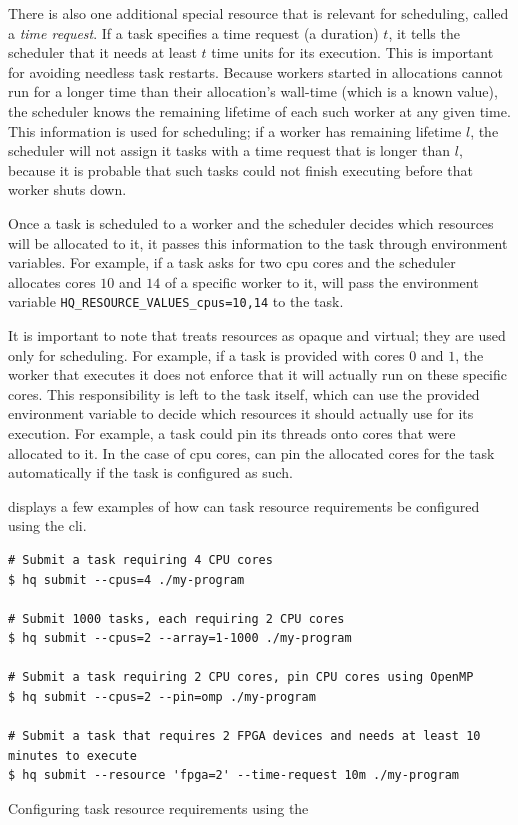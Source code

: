 There is also one additional special resource that is relevant for scheduling, called a
\emph{time request}. If a task specifies a time request (a duration) $t$, it
tells the scheduler that it needs at least $t$ time units for its execution.
This is important for avoiding needless task restarts. Because workers started in allocations
cannot run for a longer time than their allocation's wall-time (which is a known value), the
scheduler knows the remaining lifetime of each such worker at any given time. This information is
used for scheduling; if a worker has remaining lifetime $l$, the scheduler will
not assign it tasks with a time request that is longer than $l$, because it is
probable that such tasks could not finish executing before that worker shuts down.

Once a task is scheduled to a worker and the scheduler decides which resources will be allocated to
it, it passes this information to the task through environment variables. For example, if a task
asks for two \gls{cpu} cores and the scheduler allocates cores $10$
and $14$ of a specific worker to it, \hq{} will pass the
environment variable \texttt{HQ\_RESOURCE\_VALUES\_cpus=10,14} to the task.

It is important to note that \hyperqueue{} treats resources as opaque and virtual; they
are used only for scheduling. For example, if a task is provided with cores $0$
and $1$, the worker that executes it does not enforce that it will actually run
on these specific cores. This responsibility is left to the task itself, which can use the provided
environment variable to decide which resources it should actually use for its execution. For
example, a task could pin its threads onto cores that were allocated to it. In the case of
\gls{cpu} cores, \hq{} can pin the allocated cores for the task
automatically if the task is configured as such.

 displays a few examples of how can task resource requirements be
configured using the \gls{cli}.

\begin{listing}[h]
	\begin{verbatim}
# Submit a task requiring 4 CPU cores
$ hq submit --cpus=4 ./my-program

# Submit 1000 tasks, each requiring 2 CPU cores
$ hq submit --cpus=2 --array=1-1000 ./my-program

# Submit a task requiring 2 CPU cores, pin CPU cores using OpenMP
$ hq submit --cpus=2 --pin=omp ./my-program

# Submit a task that requires 2 FPGA devices and needs at least 10 minutes to execute
$ hq submit --resource 'fpga=2' --time-request 10m ./my-program
	\end{verbatim}
	\caption{Configuring task resource requirements using the \hyperqueue{} }
	\label{lst:hq-cli-task-resources}
\end{listing}

